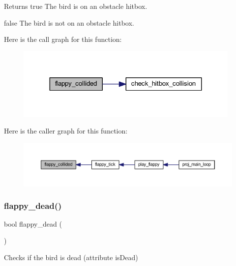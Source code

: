 \begin{DoxyReturn}{Returns}
true The bird is on an obstacle hitbox. 

false The bird is not on an obstacle hitbox. 
\end{DoxyReturn}
Here is the call graph for this function\+:\nopagebreak
\begin{figure}[H]
\begin{center}
\leavevmode
\includegraphics[width=311pt]{group__flappy_ga2b239332f6f259b99e59203e1ae3de43_cgraph}
\end{center}
\end{figure}
Here is the caller graph for this function\+:\nopagebreak
\begin{figure}[H]
\begin{center}
\leavevmode
\includegraphics[width=350pt]{group__flappy_ga2b239332f6f259b99e59203e1ae3de43_icgraph}
\end{center}
\end{figure}
\mbox{\label{group__flappy_ga0f81030140c19deb72d5f033591450a8}} 
\subsubsection{\texorpdfstring{flappy\+\_\+dead()}{flappy\_dead()}}
{\footnotesize\ttfamily bool flappy\+\_\+dead (\begin{DoxyParamCaption}{ }\end{DoxyParamCaption})}



Checks if the bird is dead (attribute is\+Dead) 

